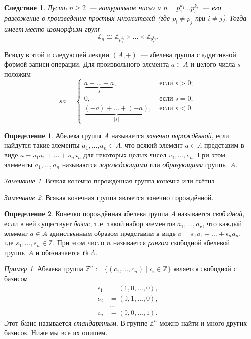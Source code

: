 \documentclass[a4paper,10pt]{amsart}
\def\rk{{\rm rk}}%
\def\ZZ{{\mathbb Z}}%
\newtheorem{corollary}{Следствие}
\theoremstyle{definition}
\newtheorem{definition}{Определение}
\theoremstyle{remark}
\newtheorem{remark}{Замечание}
\newtheorem{example}{Пример}
\begin{document}
\begin{corollary} \label{corpr}
Пусть $n \geqslant 2$~--- натуральное число и $n=p_1^{k_1}\ldots
p_s^{k_s}$~--- его разложение в произведение простых множителей
\textup(где $p_i \ne p_j$ при $i \ne j$\textup). Тогда имеет место
изоморфизм групп
$$
\ZZ_n\cong\ZZ_{p_1^{k_1}}\times\ldots\times\ZZ_{p_s^{k_s}}.
$$
\end{corollary}

Всюду в этой и следующей лекции $(A,+)$~--- абелева группа с
аддитивной формой записи операции. Для произвольного элемента $a\in
A$ и целого числа $s$ положим
$$
sa =
\begin{cases}
\underbrace{a + \ldots + a}_s, & \text{ если } s > 0; \\
0, & \text{ если } s = 0; \\
\underbrace{(-a) + \ldots + (-a)}_{|s|}, & \text{ если } s < 0.
\end{cases}
$$

\begin{definition}
Абелева группа $A$ называется {\it конечно порождённой}, если
найдутся такие элементы $a_1,\ldots,a_n\in A$, что всякий элемент
$a\in A$ представим в виде $a=s_1a_1 + \ldots + s_na_n$ для
некоторых целых чисел $s_1, \ldots, s_n$. При этом элементы $a_1,
\ldots, a_n$ называются {\it порождающими} или {\it образующими}
группы~$A$.
\end{definition}

\begin{remark}
Всякая конечно порождённая группа конечна или счётна.
\end{remark}

\begin{remark}
Всякая конечная группа является конечно порождённой.
\end{remark}

\begin{definition}
Конечно порождённая абелева группа $A$ называется {\it свободной},
если в ней существует {\it базис}, т.\,е. такой набор элементов
$a_1,\ldots, a_n$, что каждый элемент $a\in A$ единственным образом
представим в виде $a=s_1a_1 + \ldots + s_na_n$, где $s_1, \ldots,
s_n \in \ZZ$. При этом число $n$ называется {\it рангом} свободной
абелевой группы $A$ и обозначается $\rk\,A$.
\end{definition}

\begin{example}
Абелева группа $\ZZ^n:=\{(c_1,\ldots,c_n) \mid c_i\in\ZZ\}$ является
свободной с базисом
$$
\begin{aligned}
e_1 &= (1,0,\ldots,0), \\
e_2 &= (0,1,\ldots,0),\\
 &\ldots \\
e_n &= (0,0,\ldots,1).
\end{aligned}
$$
Этот базис называется {\it стандартным}. В группе $\ZZ^n$ можно
найти и много других базисов. Ниже мы все их опишем.
\end{example}
\end{document}
